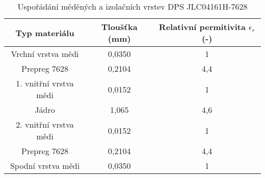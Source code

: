 \begin{table}[ht]
\centering

\begin{tabular}{|c|c|c|}
\hline 
Typ materiálu & Tloušťka (mm) & Relativní permitivita $ \epsilon_{r} $(-) \\ 
\hline 
\hline 
Vrchní vrstva mědi & 0,0350 & 1 \\ 
\hline 
Prepreg 7628 & 0,2104 & 4,4 \\ 
\hline 
1. vnitřní vrstva mědi & 0,0152 & 1 \\ 
\hline 
Jádro & 1,065 & 4,6 \\ 
\hline 
2. vnitřní vrstva mědi & 0,0152 & 1 \\ 
\hline 
Prepreg 7628 & 0,2104 & 4,4 \\ 
\hline 
Spodní vrstva mědi & 0,0350 & 1 \\ 
\hline 
\end{tabular} 

\caption{Uspořádání měděných a izolačních vrstev DPS JLC04161H-7628} 
\label{table:materialStackup}
\end{table} 
